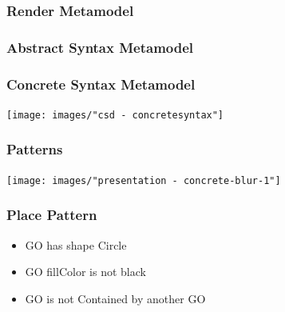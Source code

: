 \begin{frame}
  \frametitle{Render Metamodel}
  \centering
  \hspace{-1cm}
  
\end{frame}

\begin{frame}
  \frametitle{Abstract Syntax Metamodel}
  \centering
  \hspace{-1cm}
  
\end{frame}

\begin{frame}
  \frametitle{Concrete Syntax Metamodel}
  \hspace{-1cm}
  \centering
  \texttt{[image: images/"csd - concretesyntax"]}
\end{frame}

\begin{frame}
  \frametitle{Patterns}
  \hspace{-1cm}
  \centering
  \texttt{[image: images/"presentation - concrete-blur-1"]}
\end{frame}








\begin{frame}[fragile]
  \frametitle{Place Pattern}
  \vspace{-1cm}

  \begin{itemize}
    \setlength\itemsep{1cm}
    \item GO has shape Circle
    \item GO fillColor is not black
    \item GO is not Contained by another GO
  \end{itemize}
\end{frame}

